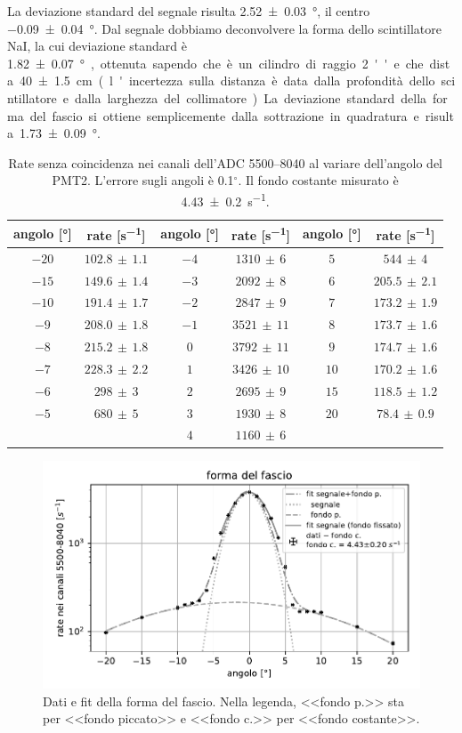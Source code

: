 La deviazione standard del segnale risulta \SI{2.52 \pm 0.03}{\degree},
il centro \SI{-0.09 \pm 0.04}{\degree}.
Dal segnale dobbiamo deconvolvere la forma dello scintillatore NaI,
la cui deviazione standard è \SI{1.82 \pm 0.07}\degree, ottenuta sapendo che è un cilindro di raggio \SI{2}{''}
e che dista \SI{40\pm 1.5}{cm} (l'incertezza sulla distanza è data dalla profondità dello scintillatore e dalla larghezza del collimatore).
La deviazione standard della forma del fascio si ottiene semplicemente dalla sottrazione in quadratura
e risulta \SI{1.73 \pm 0.09}{\degree}.

\begin{table}
	\centering

	\begin{tabular}{cc|cc|cc}
		angolo [\si{\degree}] & rate [\si{s^{-1}}] & angolo [\si{\degree}] & rate [\si{s^{-1}}] & angolo [\si{\degree}] & rate [\si{s^{-1}}] \\
		\hline
			$-20$ & $102.8\,\pm\,1.1$ & $-4$ & $1310\,\pm\,6$  & $5$ & $544\,\pm\,4$       \\
			$-15$ & $149.6\,\pm\,1.4$ & $-3$ & $2092\,\pm\,8$  & $6$ & $205.5\,\pm\,2.1$   \\
			$-10$ & $191.4\,\pm\,1.7$ & $-2$ & $2847\,\pm\,9$  & $7$ & $173.2\,\pm\,1.9$   \\
			$-9$ & $208.0\,\pm\,1.8$  & $-1$ & $3521\,\pm\,11$ & $8$ & $173.7\,\pm\,1.6$   \\
			$-8$ & $215.2\,\pm\,1.8$  & $0$ & $3792\,\pm\,11$  & $9$ & $174.7\,\pm\,1.6$   \\
			$-7$ & $228.3\,\pm\,2.2$  & $1$ & $3426\,\pm\,10$  & $10$ & $170.2\,\pm\,1.6$  \\
			$-6$ & $298\,\pm\,3$      & $2$ & $2695\,\pm\,9$   & $15$ & $118.5\,\pm\,1.2$  \\
			$-5$ & $680\,\pm\,5$      & $3$ & $1930\,\pm\,8$   & $20$ & $78.4\,\pm\,0.9$   \\
			     &                  & $4$ & $1160\,\pm\,6$   &      &
	\end{tabular}

	\caption{Rate senza coincidenza nei canali dell'ADC 5500--8040
	al variare dell'angolo del PMT2.
	L'errore sugli angoli è 0.1$^{\circ}$.
	Il fondo costante misurato è \SI{4.43\pm0.2}{s^{-1}}.}
	\label{tabfo}
\end{table}

\begin{figure}
	\centering
	\includegraphics[width=32em]{forma}
	\caption{Dati e fit della forma del fascio.
	Nella legenda, <<fondo p.>> sta per <<fondo piccato>> e <<fondo c.>> per <<fondo costante>>.}
	\label{forma}
\end{figure}



